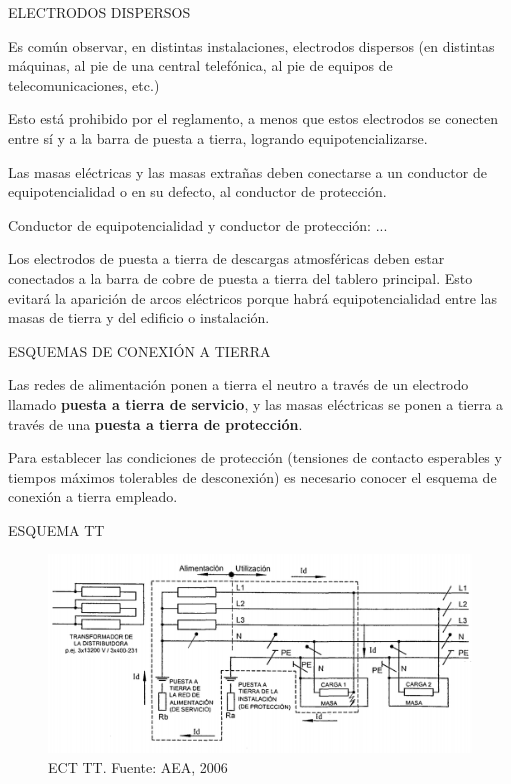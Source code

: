 
ELECTRODOS DISPERSOS

Es común observar, en distintas instalaciones, electrodos dispersos (en distintas máquinas, al pie de una central telefónica, al pie de equipos de telecomunicaciones, etc.)

Esto está prohibido por el reglamento, a menos que estos electrodos se conecten entre sí y a la barra de puesta a tierra, logrando equipotencializarse.

Las masas eléctricas y las masas extrañas deben conectarse a un conductor de equipotencialidad o en su defecto, al conductor de protección.

Conductor de equipotencialidad y conductor de protección: ...

Los electrodos de puesta a tierra de descargas atmosféricas deben estar conectados a la barra de cobre de puesta a tierra del tablero principal. Esto evitará la aparición de arcos eléctricos porque habrá equipotencialidad entre las masas de tierra y del edificio o instalación.


ESQUEMAS DE CONEXIÓN A TIERRA

Las redes de alimentación ponen a tierra el neutro a través de un electrodo llamado \textbf{puesta a tierra de servicio}, y las masas eléctricas se ponen a tierra a través de una \textbf{puesta a tierra de protección}.

Para establecer las condiciones de protección (tensiones de contacto esperables y tiempos máximos tolerables de desconexión) es necesario conocer el esquema de conexión a tierra empleado.

ESQUEMA TT

\begin{figure}[htbp]
  \centering  
  \includegraphics[width=\textwidth]{images/ect-tt}
  \caption{ECT TT. Fuente: AEA, 2006}
  \label{fig:ect-tt}
\end{figure}

